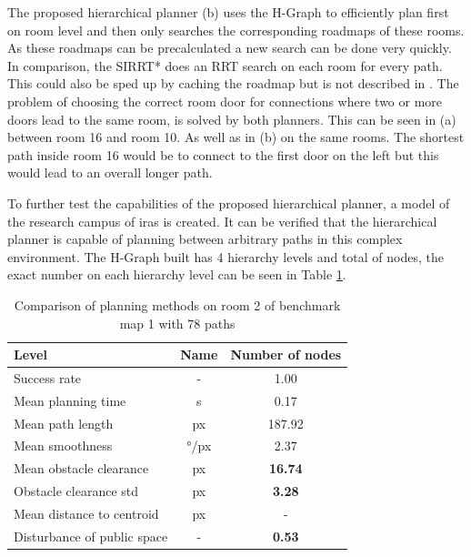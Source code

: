The proposed hierarchical planner (b) uses the H-Graph to efficiently plan first on room level and then only searches the corresponding roadmaps of these rooms. As these roadmaps can be precalculated a new search can be done very quickly. In comparison, the SIRRT* does an RRT search on each room for every path. This could also be sped up by caching the roadmap but is not described in \cite{ryu_hierarchical_2020}. The problem of choosing the correct room door for connections where two or more doors lead to the same room, is solved by both planners. This can be seen in (a) between room 16 and room 10. As well as in (b) on the same rooms. The shortest path inside room 16 would be to connect to the first door on the left but this would lead to an overall longer path. 

To further test the capabilities of the proposed hierarchical planner, a model of the research campus of \gls{iras} is created. It can be verified that the hierarchical planner is capable of planning between arbitrary paths in this complex environment. The H-Graph built has 4 hierarchy levels and total of  nodes, the exact number on each hierarchy level can be seen in Table \ref{tab:ltc_graph_nodes}.

\begin{table}[ht]
\centering
\begin{tabular}{lcc}
\hline
\textbf{Level} & \textbf{Name} & \textbf{Number of nodes} \\
\hline
Success rate & - & 1.00 \\
Mean planning time & s & 0.17\\
Mean path length & px & 187.92  \\
Mean smoothness & °/px & 2.37  \\
Mean obstacle clearance & px & \textbf{16.74}  \\
Obstacle clearance std & px & \textbf{3.28} \\
Mean distance to centroid & px & - \\
Disturbance of public space & - & \textbf{0.53} \\
\hline
\end{tabular}
\caption{Comparison of planning methods on room 2 of benchmark map 1 with 78 paths}
\label{tab:ltc_graph_nodes}
\end{table}


